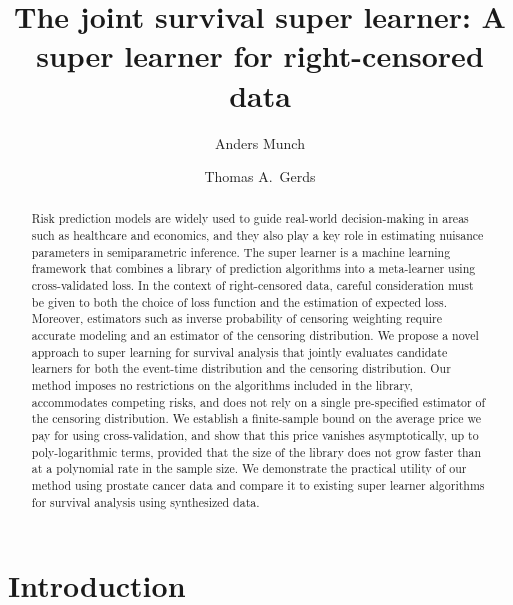 \documentclass[alpha-refs]{wiley-article}
\title{The joint survival super learner: A super learner for right-censored
  data}
\author[1]{Anders Munch}
\author[1]{Thomas A.~Gerds}
\affil[1]{Section of Biostatistics, University of Copenhagen}
\newcommand{\1}{\mathbb{1}} %
\begin{document}
\maketitle

\begin{abstract}
  Risk prediction models are widely used to guide
  real-world decision-making in areas such as healthcare and
  economics, and they also play a key role in estimating nuisance
  parameters in semiparametric inference. The super learner is a
  machine learning framework that combines a library of prediction
  algorithms into a meta-learner using cross-validated loss. In the
  context of right-censored data, careful consideration must be given
  to both the choice of loss function and the estimation of expected
  loss.  Moreover, estimators such as inverse probability of censoring
  weighting require accurate modeling and an estimator of the
  censoring distribution. We propose a novel approach to super
  learning for survival analysis that jointly evaluates candidate
  learners for both the event-time distribution and the censoring
  distribution. Our method imposes no restrictions on the algorithms
  included in the library, accommodates competing risks, and does not
  rely on a single pre-specified estimator of the censoring
  distribution. We establish a finite-sample bound on the average
  price we pay for using cross-validation, and show that this price
  vanishes asymptotically, up to poly-logarithmic terms, provided that
  the size of the library does not grow faster than at a polynomial
  rate in the sample size. We demonstrate the practical utility of our
  method using prostate cancer data and compare it to existing super
  learner algorithms for survival analysis using synthesized data.

\end{abstract}


\section{Introduction}
\label{sec:introduction}
\end{document}
